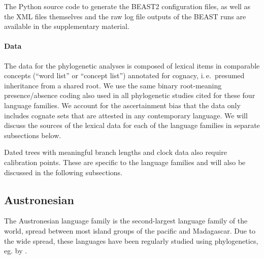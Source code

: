 \documentclass[]{rsos}%
\begin{document}
The Python source code to generate the BEAST2 configuration files, as well as
the XML files themselves and the raw log file outputs of the BEAST runs are
available in the supplementary material.


\paragraph{Data}

The data for the phylogenetic analyses is composed of lexical items in comparable concepts (“word list” or “concept list”) annotated
for cognacy, i.\,e.\ presumed inheritance from a shared root.
We use the same binary root-meaning presence/absence coding also used in all
phylogenetic studies cited for these four language families.
We account for the ascertainment bias that the data
only includes cognate sets that are attested in any contemporary language.
We will discuss the sources of the lexical data for each of the language families in separate subsections below.

Dated trees with meaningful branch lengths and clock data also require calibration points.
These are specific to the language families and will also be discussed in the following subsections.


\subsection{Austronesian}\label{s:austronesian}

The Austronesian language family is the second-largest language family of the world, spread between most island groups of the pacific and Madagascar.
Due to the wide spread, these languages have been regularly studied using phylogenetics, eg. by
\textcite{gray2009language,greenhill2017evolutionary,greenhill2018population}.
\end{document}
